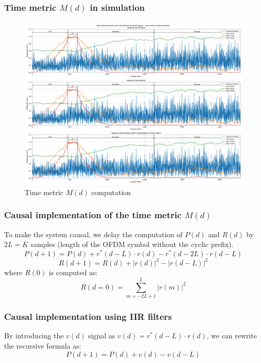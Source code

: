 \documentclass[10pt]{beamer}
\begin{document}
\begin{frame}
    \frametitle{Time metric $M(d)$ in simulation}
    \begin{figure}
        \centering
        \includegraphics[width=\textwidth]{schmidl_cox_plots/metrics.pdf}
        \caption{Time metric $M(d)$ computation}
    \end{figure}
\end{frame}

\begin{frame}
    \frametitle{Causal implementation of the time metric $M(d)$}
    To make the system causal, we delay the computation of $P(d)$ and $R(d)$ by $2L = K$ samples (length of the OFDM symbol without the cyclic prefix).
    \begin{equation}
        \label{eq:P_causal}
        P(d+1) = P(d) + r^*(d-L) \cdot r(d) - r^*(d-2L) \cdot r(d-L)
    \end{equation}
    \begin{equation}
        \label{eq:R_causal}
        R(d+1) = R(d) + |r(d)|^2 - |r(d - L)|^2
    \end{equation}
    where $R(0)$ is computed as:
    \begin{equation}
        R(d = 0) = \sum_{m=-2L + 1}^{L} |r(m)|^2
    \end{equation}
\end{frame}

\begin{frame}
    \frametitle{Causal implementation using IIR filters}
    By introducing the $v(d)$ signal as $v(d) = r^*(d-L) \cdot r(d)$, we can rewrite the recursive formula as:
    \begin{equation}
        P(d+1) = P(d) + v(d) - v(d-L)
    \end{equation}
\end{frame}
\end{document}

